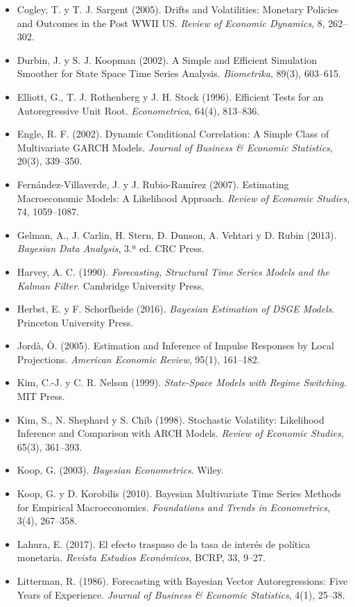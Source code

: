 \documentclass[11pt,a4paper]{article}
\begin{document}
{\begin{itemize}[leftmargin=1.4em,itemsep=1pt,label={}]
\item Cogley, T. y T. J. Sargent (2005). Drifts and Volatilities: Monetary Policies and Outcomes in the Post WWII US. \emph{Review of Economic Dynamics}, 8, 262--302.
\item Durbin, J. y S. J. Koopman (2002). A Simple and Efficient Simulation Smoother for State Space Time Series Analysis. \emph{Biometrika}, 89(3), 603--615.
\item Elliott, G., T. J. Rothenberg y J. H. Stock (1996). Efficient Tests for an Autoregressive Unit Root. \emph{Econometrica}, 64(4), 813--836.
\item Engle, R. F. (2002). Dynamic Conditional Correlation: A Simple Class of Multivariate GARCH Models. \emph{Journal of Business \& Economic Statistics}, 20(3), 339--350.
\item Fernández-Villaverde, J. y J. Rubio-Ramírez (2007). Estimating Macroeconomic Models: A Likelihood Approach. \emph{Review of Economic Studies}, 74, 1059--1087.
\item Gelman, A., J. Carlin, H. Stern, D. Dunson, A. Vehtari y D. Rubin (2013). \emph{Bayesian Data Analysis}, 3.ª ed. CRC Press.
\item Harvey, A. C. (1990). \emph{Forecasting, Structural Time Series Models and the Kalman Filter}. Cambridge University Press.
\item Herbst, E. y F. Schorfheide (2016). \emph{Bayesian Estimation of DSGE Models}. Princeton University Press.
\item Jordà, Ò. (2005). Estimation and Inference of Impulse Responses by Local Projections. \emph{American Economic Review}, 95(1), 161--182.
\item Kim, C.-J. y C. R. Nelson (1999). \emph{State-Space Models with Regime Switching}. MIT Press.
\item Kim, S., N. Shephard y S. Chib (1998). Stochastic Volatility: Likelihood Inference and Comparison with ARCH Models. \emph{Review of Economic Studies}, 65(3), 361--393.
\item Koop, G. (2003). \emph{Bayesian Econometrics}. Wiley.
\item Koop, G. y D. Korobilis (2010). Bayesian Multivariate Time Series Methods for Empirical Macroeconomics. \emph{Foundations and Trends in Econometrics}, 3(4), 267--358.
\item Lahura, E. (2017). El efecto traspaso de la tasa de interés de política monetaria. \emph{Revista Estudios Económicos}, BCRP, 33, 9--27.
\item Litterman, R. (1986). Forecasting with Bayesian Vector Autoregressions: Five Years of Experience. \emph{Journal of Business \& Economic Statistics}, 4(1), 25--38.

\end{itemize}}
\end{document}
